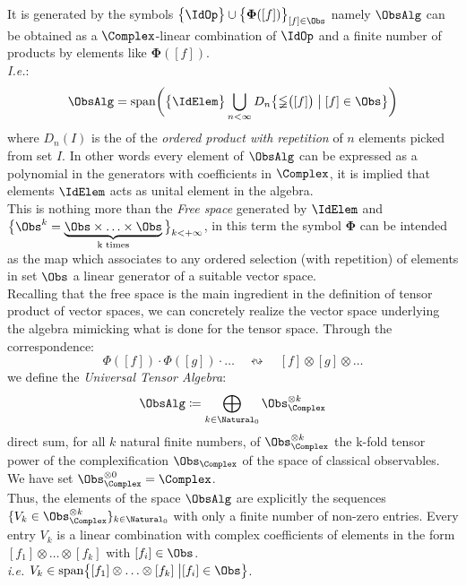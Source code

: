 \documentclass[Main]{subfiles}
\begin{document}
   				It is generated
   				by the symbols $\big\{\IdOp\big\}\cup\big\{\mathbf{\Phi}([f])\big\}_{[f]\in \Obs}$ %
   				namely $\ObsAlg$ can be obtained as a $\Complex$-linear combination of $\IdOp$ and a finite number of products by elements like $\mathbf{\Phi}([f])$.\\
   				\textit{I.e.}:
   				\begin{displaymath}
   					\ObsAlg = \textrm{span} \biggr( \big\{\IdElem\big\}\bigcup_{n<\infty}D_n
   					\big\{\mathbb{\Phi}\big( [f]\big) \; \big\vert \;  [f] \in \Obs \big\}
   					\biggr)
   				\end{displaymath}
				where $D_n (I)$ is the of the \emph{ordered product with repetition}  of $n$ elements picked from set $I$.
   				In other words every element of $\ObsAlg$ can be expressed as a polynomial in the generators with coefficients in $\Complex$, it is implied that elements $\IdElem$ acts as unital element in the algebra.
   				\\
				This is nothing more than the \emph{Free space} generated by $\IdElem$ and $\big\{\Obs^k = 
   				\underbrace{\Obs\times \ldots \times \Obs}_{\textrm{k times}} \big\}_{k< + \infty}$, in this term the symbol $\mathbf{\Phi}$ can be intended as the map which associates to any %
   				ordered selection (with repetition) 
   				of elements in set $\Obs$ a linear generator of a suitable vector space.
   				\\
   				Recalling that the free space is the main ingredient in the definition of tensor product of vector spaces, we can concretely realize the vector space underlying the algebra mimicking what is done for the tensor space.
   				Through the correspondence:
   				\begin{displaymath}
   					\mathbb{\Phi}([f]) \cdot \mathbb{\Phi}([g]) \cdot \ldots \quad \leftrightsquigarrow \quad [f] \otimes [g] \otimes \ldots
   				\end{displaymath}
   				we define %
   				the \emph{Universal Tensor Algebra}:
   				\begin{displaymath}
   					\ObsAlg \coloneqq \bigoplus_{k \in \Natural_0} \Obs_\Complex^{\otimes k}
   				\end{displaymath}
   				direct sum, for all $k$ natural finite numbers, of $\Obs_\Complex^{\otimes k}$ the k-fold tensor power of the complexification $\Obs_\Complex$ of the space of classical observables.
   				We have set $\Obs_\Complex^{\otimes 0} = \Complex$.
				\\
				Thus, the elements of the space $\ObsAlg$ are explicitly the sequences $\{ V_k \in \Obs_\Complex^{\otimes k} \}_{k\in \Natural_0}$ with only a finite number of non-zero entries.
				Every entry $V_k$ is a linear combination with complex coefficients  of elements in the form $[f_1]\otimes\ldots \otimes [f_k]$ with $[f_i] \in \Obs$.\\
				\textit{i.e.} $V_k \in \textrm{span}\big\{[f_1]\otimes\ldots \otimes [f_k] \; \big \vert [f_i] \in \Obs \big\}$.
			
\end{document}
